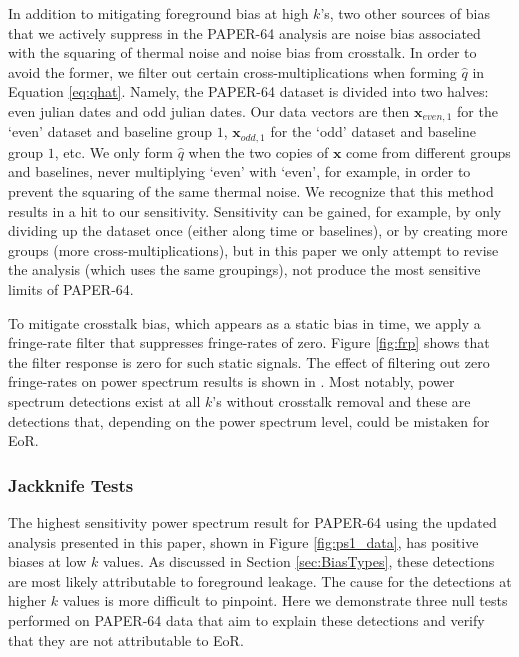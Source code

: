 \documentclass[preprint2,numberedappendix,tighten]{aastex6}  %
\begin{document}
In addition to mitigating foreground bias at high $k$'s, two other sources of bias that we actively suppress in the PAPER-64 
analysis are noise bias associated with the squaring of thermal noise and noise bias from crosstalk. In order to avoid the 
former, we filter out certain cross-multiplications when forming $\widehat{q}$ in Equation \eqref{eq:qhat}. Namely, the PAPER-64 
dataset is divided into two halves: even julian dates and odd julian dates. Our data vectors are then $\textbf{x}_{even, 1}$ for 
the `even' dataset and baseline group $1$, $\textbf{x}_{odd, 1}$ for the `odd' dataset and baseline group $1$, etc. We only form 
$\widehat{q}$ when the two copies of $\textbf{x}$ come from different groups and baselines, never multiplying `even' with `even', for 
example, in order to prevent the squaring of the same thermal noise. We recognize that this method results in a hit to our sensitivity. Sensitivity can be gained, for example, by only dividing up the dataset once (either along time or baselines), or by creating more groups (more cross-multiplications), but in this paper we only attempt to revise the  analysis (which uses the same groupings), not produce the most sensitive limits of PAPER-64.

To mitigate crosstalk bias, which appears as a static bias in time, we apply a fringe-rate filter that suppresses fringe-rates of 
zero. Figure \ref{fig:frp} shows that the filter response is zero for such static signals. The effect of filtering out zero fringe-rates 
on power spectrum results is shown in . Most notably, power spectrum detections exist at all $k$'s without crosstalk 
removal and these are detections that, depending on the power spectrum level, could be mistaken for EoR. 

\subsubsection{Jackknife Tests}

The highest sensitivity power spectrum result for PAPER-64 using the updated analysis presented in this paper, shown in 
Figure \ref{fig:ps1_data}, has positive biases at low $k$ values. As discussed in Section \ref{sec:BiasTypes}, these detections 
are most likely attributable to foreground leakage. The cause for the detections at higher $k$ values is more difficult to pinpoint. Here we demonstrate three null tests performed on PAPER-64 data that aim to explain these detections and verify 
that they are not attributable to EoR.
\end{document}

